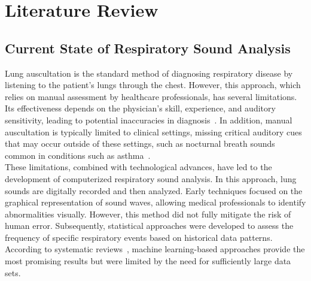 \cleardoubleoddpage%
\chapter{Literature Review}

\section{Current State of Respiratory Sound Analysis}
Lung auscultation is the standard method of diagnosing respiratory disease by listening to the patient's lungs through the chest. However, this approach, which relies on manual assessment by healthcare professionals, has several limitations. Its effectiveness depends on the physician's skill, experience, and auditory sensitivity, leading to potential inaccuracies in diagnosis~\cite{palaniappan2013computer}. In addition, manual auscultation is typically limited to clinical settings, missing critical auditory cues that may occur outside of these settings, such as nocturnal breath sounds common in conditions such as asthma~\cite{pramono2017automatic}. \\
These limitations, combined with technological advances, have led to the development of computerized respiratory sound analysis. In this approach, lung sounds are digitally recorded and then analyzed. Early techniques focused on the graphical representation of sound waves, allowing medical professionals to identify abnormalities visually. However, this method did not fully mitigate the risk of human error. Subsequently, statistical approaches were developed to assess the frequency of specific respiratory events based on historical data patterns. According to systematic reviews~\cite{palaniappan2013computer}, machine learning-based approaches provide the most promising results but were limited by the need for sufficiently large data sets.

